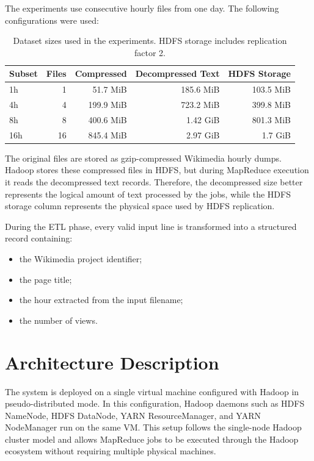 \documentclass[12pt,a4paper]{report}
\begin{document}
The experiments use consecutive hourly files from one day. The following configurations were used:

\begin{table}[H]
\centering
\begin{tabular}{lrrrr}
\toprule
Subset & Files & Compressed & Decompressed Text & HDFS Storage \\
\midrule
1h & 1 & 51.7 MiB & 185.6 MiB & 103.5 MiB \\
4h & 4 & 199.9 MiB & 723.2 MiB & 399.8 MiB \\
8h & 8 & 400.6 MiB & 1.42 GiB & 801.3 MiB \\
16h & 16 & 845.4 MiB & 2.97 GiB & 1.7 GiB \\
\bottomrule
\end{tabular}
\caption{Dataset sizes used in the experiments. HDFS storage includes replication factor 2.}
\end{table}

The original files are stored as gzip-compressed Wikimedia hourly dumps. Hadoop stores these compressed files in HDFS, but during MapReduce execution it reads the decompressed text records. Therefore, the decompressed size better represents the logical amount of text processed by the jobs, while the HDFS storage column represents the physical space used by HDFS replication.

During the ETL phase, every valid input line is transformed into a structured record containing:

\begin{itemize}
    \item the Wikimedia project identifier;
    \item the page title;
    \item the hour extracted from the input filename;
    \item the number of views.
\end{itemize}

\chapter{Architecture Description}

The system is deployed on a single virtual machine configured with Hadoop in pseudo-distributed mode. In this configuration, Hadoop daemons such as HDFS NameNode, HDFS DataNode, YARN ResourceManager, and YARN NodeManager run on the same VM. This setup follows the single-node Hadoop cluster model and allows MapReduce jobs to be executed through the Hadoop ecosystem without requiring multiple physical machines.
\end{document}
